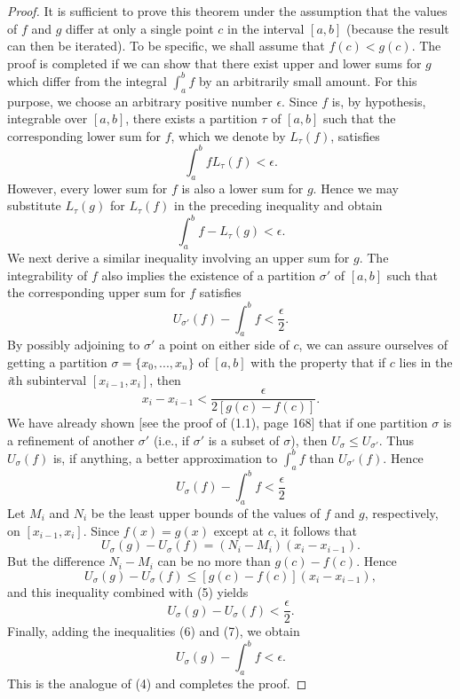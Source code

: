 \begin{proof}
It is sufficient to prove this theorem under the assumption that the values of $f$ and $g$ differ at only a single point $c$ in the interval $[a, b]$ (because the result can then be iterated). To be specific, we shall assume that $f(c) < g(c)$. The proof is completed if we can show that there exist upper and lower sums for $g$ which differ from the integral $\int_a^b f$ by an arbitrarily small amount. For this purpose, we choose an arbitrary positive number $\epsilon$. Since $f$ is, by hypothesis, integrable over $[a, b]$, there exists a partition $\tau$ of $[a, b]$ such that the corresponding lower sum for $f$, which we denote by $L_\tau (f)$, satisfies
$$
\int_a^b f L_\tau (f) < \epsilon.
$$
However, every lower sum for $f$ is also a lower sum for $g$. Hence we may substitute $L_\tau (g)$ for $L_\tau (f)$ in the preceding inequality and obtain
\begin{equation}
\int_a^b f - L_\tau (g) < \epsilon.  
\label{eq8.6.4}
\end{equation}
We next derive a similar inequality involving an upper sum for $g$. The integrability of $f$ also implies the existence of a partition $\sigma'$ of $[a, b]$ such that the corresponding upper sum for $f$ satisfies
$$
U_{\sigma'} (f) - \int_a^b f < \frac{\epsilon}{2}.
$$
By possibly adjoining to $\sigma'$ a point on either side of $c$, we can assure ourselves of getting a partition $\sigma = \{ x_0,  ..., x_n \}$ of $[a, b]$ with the property that if $c$ lies in the \textit{i}th subinterval $[x_{i-1}, x_i]$, then
\begin{equation}
x_i - x_{i-1} < \frac{\epsilon}{2[g(c) - f(c)]} .
\label{eq8.6.5}
\end{equation}
We have already shown [see the proof of (1.1), page 168] that if one partition $\sigma$ is a refinement of another $\sigma'$ (i.e., if $\sigma'$ is a subset of $\sigma$), then $U_\sigma \leq U_{\sigma'}$. Thus $U_\sigma (f)$ is, if anything, a better approximation to $\int_a^b f$ than $U_{\sigma'} (f)$. Hence
\begin{equation}
U_\sigma (f) - \int_a^b f <  \frac{\epsilon}{2} 
\label{eq8.6.6}
\end{equation}
Let $M_i$ and $N_i$ be the least upper bounds of the values of $f$ and $g$, respectively, on $[x_{i-1}, x_i]$. Since $f(x) = g(x)$ except at $c$, it follows that
$$
U_\sigma (g) - U_\sigma (f) = (N_i - M_i)(x_i - x_{i-1}).
$$
But the difference $N_i - M_i$ can be no more than $g(c) - f(c)$. Hence
$$
 U_\sigma (g) - U_\sigma (f) \leq [g(c) - f (c)](x_i - x_{i-1}), 
$$
and this inequality combined with (5) yields
\begin{equation}
U_\sigma (g) - U_\sigma (f) < \frac{\epsilon}{2}  .
\label{eq8.6.7}
\end{equation}
Finally, adding the inequalities (6) and (7), we obtain 
$$
U_\sigma (g) - \int_a^b f < \epsilon .
$$
This is the analogue of (4) and completes the proof.
\end{proof}


